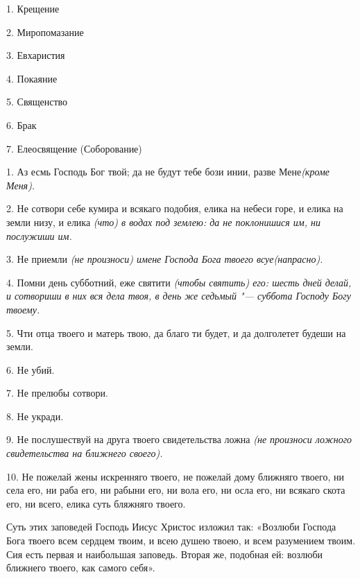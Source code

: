


 

 


1. Крещение


2. Миропомазание


3. Евхаристия


4. Покаяние


5. Священство


6. Брак


7. Елеосвящение (Соборование)


\bigskip\bigskip\mychapterending

 


1. Аз есмь Господь Бог твой; да не будут тебе бози инии, разве Мене\itshape  (кроме Меня)\normalfont{}.

2. Не сотвори себе кумира и всякаго подобия, елика на небеси горе, и елика на земли низу, и елика \itshape (что)\normalfont{} в водах под землею: да не поклонишися им, ни послужиши им.

3. Не приемли \itshape (не произноси)\normalfont{} имене Господа Бога твоего всуе\itshape  (напрасно)\normalfont{}.

4. Помни день субботний, еже святити \itshape (чтобы святить) \normalfont{}его: шесть дней делай, и сотвориши в них вся дела твоя, в день же седьмый "--- суббота Господу Богу твоему.

5. Чти отца твоего и матерь твою, да благо ти будет, и да долголетет будеши на земли.

6. Не убий.

7. Не прелюбы сотвори.

8. Не укради.

9. Не послушествуй на друга твоего свидетельства ложна \itshape (не произноси ложного свидетельства на ближнего своего)\normalfont{}.

10. Не пожелай жены искренняго твоего, не пожелай дому ближняго твоего, ни села его, ни раба его, ни рабыни его, ни вола его, ни осла его, ни всякаго скота его, ни всего, елика суть бляжняго твоего.


Суть этих заповедей Господь Иисус Христос изложил так: «Возлюби Господа Бога твоего всем сердцем твоим, и всею душею твоею, и всем разумением твоим. Сия есть первая и наибольшая заповедь. Вторая же, подобная ей: возлюби ближнего твоего, как самого себя».

